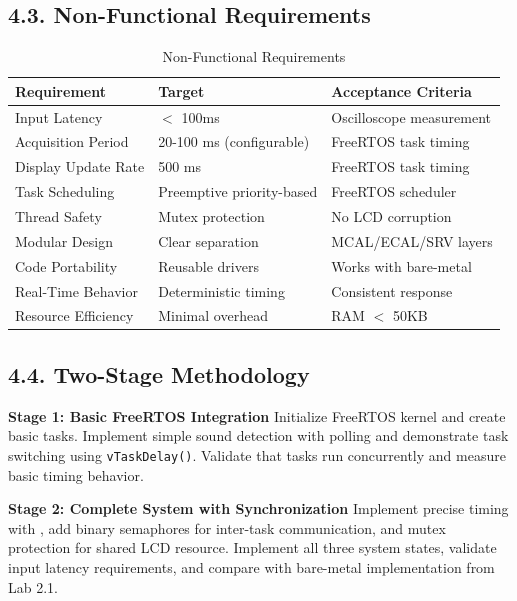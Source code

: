 \documentclass[12pt]{article}
\begin{document}
\subsection*{4.3. Non-Functional Requirements}

\begin{table}[H]
	\centering
	\caption{Non-Functional Requirements}
	\label{tab:non-functional-requirements}
	\begin{tabular}{|l|l|l|}
		\hline
		\textbf{Requirement} & \textbf{Target} & \textbf{Acceptance Criteria} \\
		\hline
		Input Latency & $<$ 100ms & Oscilloscope measurement \\
		\hline
		Acquisition Period & 20-100 ms (configurable) & FreeRTOS task timing \\
		\hline
		Display Update Rate & 500 ms & FreeRTOS task timing \\
		\hline
		Task Scheduling & Preemptive priority-based & FreeRTOS scheduler \\
		\hline
		Thread Safety & Mutex protection & No LCD corruption \\
		\hline
		Modular Design & Clear separation & MCAL/ECAL/SRV layers \\
		\hline
		Code Portability & Reusable drivers & Works with bare-metal \\
		\hline
		Real-Time Behavior & Deterministic timing & Consistent response \\
		\hline
		Resource Efficiency & Minimal overhead & RAM $<$ 50KB \\
		\hline
	\end{tabular}
\end{table}

\subsection*{4.4. Two-Stage Methodology}

\textbf{Stage 1: Basic FreeRTOS Integration}
\newline
Initialize FreeRTOS kernel and create basic tasks. Implement simple sound detection with polling and demonstrate task switching using \texttt{vTaskDelay()}. Validate that tasks run concurrently and measure basic timing behavior.

\textbf{Stage 2: Complete System with Synchronization}
\newline
Implement precise timing with , add binary semaphores for inter-task communication, and mutex protection for shared LCD resource. Implement all three system states, validate input latency requirements, and compare with bare-metal implementation from Lab 2.1.
\end{document}
